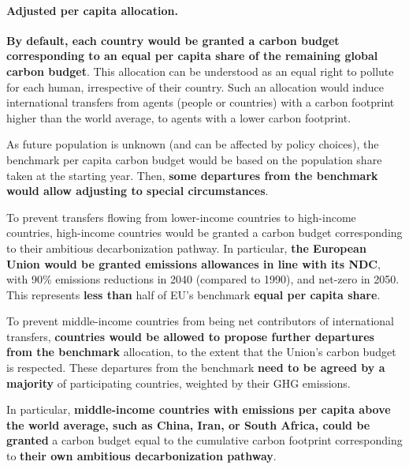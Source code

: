 \documentclass[12pt,english]{article}
\begin{document}
\paragraph{Adjusted per capita allocation.}
\textbf{By default, each country would be granted a carbon budget corresponding to an equal per capita share of the remaining global carbon budget}. This allocation can be understood as an equal right to pollute for each human, irrespective of their country. Such an allocation would induce international transfers from agents (people or countries) with a carbon footprint higher than the world average, to agents with a lower carbon footprint.

As future population is unknown (and can be affected by policy choices), the benchmark per capita carbon budget would be based on the population share taken at the starting year. %
Then, \textbf{some departures from the benchmark would allow adjusting to special circumstances}.

To prevent transfers flowing from lower-income countries to high-income countries, high-income countries would be granted a carbon budget corresponding to their ambitious decarbonization pathway. In particular, \textbf{the European Union would be granted emissions allowances in line with its NDC}, with 90\% emissions reductions in 2040 (compared to 1990), and net-zero in 2050. This represents \textbf{less than} half of EU's benchmark \textbf{equal per capita share}.

To prevent middle-income countries from being net contributors of international transfers, \textbf{countries would be allowed to propose further departures from the benchmark} allocation, to the extent that the Union's carbon budget is respected. These departures from the benchmark \textbf{need to be agreed by a majority} of participating countries, weighted by their GHG emissions. %

In particular, \textbf{middle-income countries with emissions per capita above the world average, such as China, Iran, or South Africa, could be granted} a carbon budget equal to the cumulative carbon footprint corresponding to \textbf{their own ambitious decarbonization pathway}.
\end{document}
